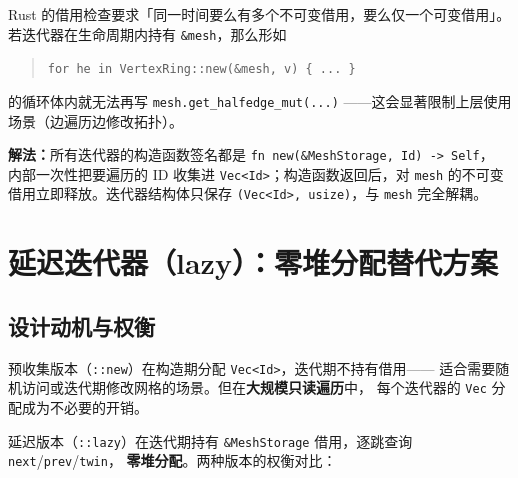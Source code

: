 \documentclass[11pt,a4paper]{article}
\begin{document}
Rust 的借用检查要求「同一时间要么有多个不可变借用，要么仅一个可变借用」。
若迭代器在生命周期内持有 \texttt{\&mesh}，那么形如
\begin{quote}
\texttt{for he in VertexRing::new(\&mesh, v) \{ ... \}}
\end{quote}
的循环体内就无法再写 \texttt{mesh.get\_halfedge\_mut(...)}
——这会显著限制上层使用场景（边遍历边修改拓扑）。

\textbf{解法：}所有迭代器的构造函数签名都是
\texttt{fn new(\&MeshStorage, Id) -> Self}，
内部一次性把要遍历的 ID 收集进 \texttt{Vec<Id>}；构造函数返回后，对 \texttt{mesh}
的不可变借用立即释放。迭代器结构体只保存 \texttt{(Vec<Id>, usize)}，与 \texttt{mesh}
完全解耦。

\begin{center}
\end{center}

\section{延迟迭代器（lazy）：零堆分配替代方案}

\subsection{设计动机与权衡}

预收集版本（\texttt{::new}）在构造期分配 \texttt{Vec<Id>}，迭代期不持有借用——
适合需要随机访问或迭代期修改网格的场景。但在\textbf{大规模只读遍历}中，
每个迭代器的 \texttt{Vec} 分配成为不必要的开销。

延迟版本（\texttt{::lazy}）在迭代期持有 \texttt{\&MeshStorage} 借用，逐跳查询 \texttt{next}/\texttt{prev}/\texttt{twin}，
\textbf{零堆分配}。两种版本的权衡对比：
\end{document}
